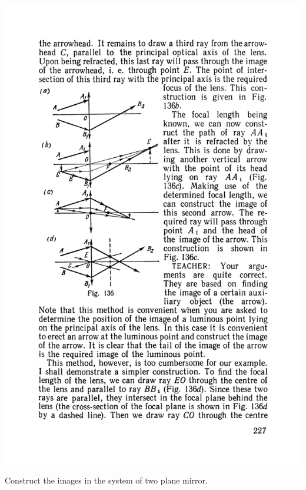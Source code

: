\documentclass[a4paper,sfsidenotes]{tufte-book}
\begin{document}
\begin{marginfigure}%
\includegraphics[width=1.1\linewidth]{fig-136a}
\caption{Construct the images in the system of two plane mirror.}
\label{fig-136}
\end{marginfigure}
\end{document}
